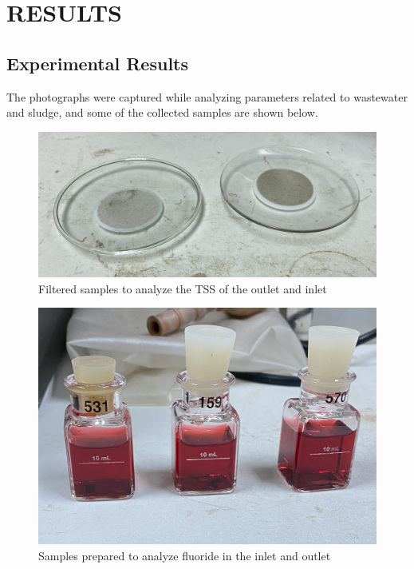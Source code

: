 \newpage
\section{RESULTS}

\subsection{Experimental Results}
The photographs were captured while analyzing parameters related to wastewater and sludge, and some of the collected samples are shown below.








\begin{figure}[H]
\centering
\includegraphics[width=0.77\linewidth]{results/tss_analyze_sample.JPG}
\caption{Filtered samples to analyze the \ac{TSS} of the outlet and inlet}
\label{fig:tss_analyze_sample}
\end{figure}


\begin{figure}[H]
\centering
\includegraphics[width=0.6\linewidth]{results/fluoride_analyze_sample.JPG}
\caption{Samples prepared to analyze fluoride in the inlet and outlet}
\label{fig:fluoride_analyze_sample}
\end{figure}




